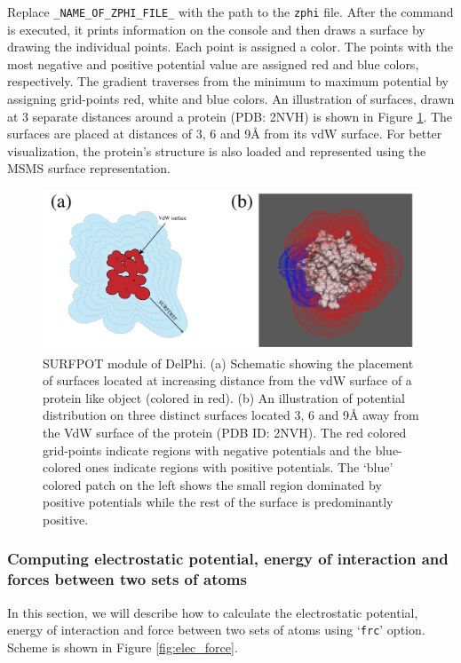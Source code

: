 \documentclass[9pt,tutorial,pubversion]{livecoms}
\begin{document}
Replace \texttt{\_NAME\_OF\_ZPHI\_FILE\_} with the path to the \texttt{zphi} file. After the command is executed, it prints information on the console and then draws a surface by drawing the individual points. Each point is assigned a color. The points with the most negative and positive potential value are assigned red and blue colors, respectively. The gradient traverses from the minimum to maximum potential by assigning grid-points red, white and blue colors. An illustration of surfaces, drawn at 3 separate distances around a protein (PDB: 2NVH) is shown in Figure \ref{fig:zeta-potential}. The surfaces are placed at distances of 3, 6 and 9Å from its vdW surface. For better visualization, the protein’s structure is also loaded and represented using the MSMS surface representation. 

\begin{figure}
\includegraphics[width=0.95\linewidth]{Figure_9.png}
\caption{SURFPOT module of DelPhi. (a) Schematic showing the placement of surfaces located at increasing distance from the vdW surface of a protein like object (colored in red). (b) An illustration of potential distribution on three distinct surfaces located 3, 6 and 9Å away from the VdW surface of the protein (PDB ID: 2NVH). The red colored grid-points indicate regions with negative potentials and the blue-colored ones indicate regions with positive potentials. The ‘blue’ colored patch on the left shows the small region dominated by positive potentials while the rest of the surface is predominantly positive.}
\label{fig:zeta-potential}
\end{figure}


\subsubsection{Computing electrostatic potential, energy of interaction and forces between two sets of atoms}
In this section, we will describe how to calculate the electrostatic potential, energy of interaction and force between two sets of atoms using ‘\texttt{frc}’ option. Scheme is shown in Figure \ref{fig:elec_force}.
\end{document}
